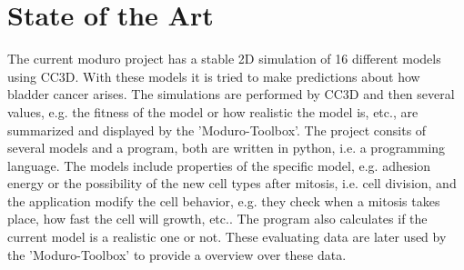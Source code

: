 \chapter{State of the Art}
The current moduro project has a stable 2D simulation of 16 different models using \ac{CC3D}. With these models it is tried to make predictions about how bladder cancer arises. The simulations are performed by \ac{CC3D} and then several values, e.g. the fitness of the model or how realistic the model is, etc., are summarized and displayed by the 'Moduro-Toolbox'. The project consits of several models and a program, both are written in python, i.e. a programming language. The models include properties of the specific model, e.g. adhesion energy or the possibility of the new cell types after mitosis, i.e. cell division, and the application modify the cell behavior, e.g. they check when a mitosis takes place, how fast the cell will growth, etc.. The program also calculates if the current model is a realistic one or not. These evaluating data are later used by the 'Moduro-Toolbox' to provide a overview over these data.

